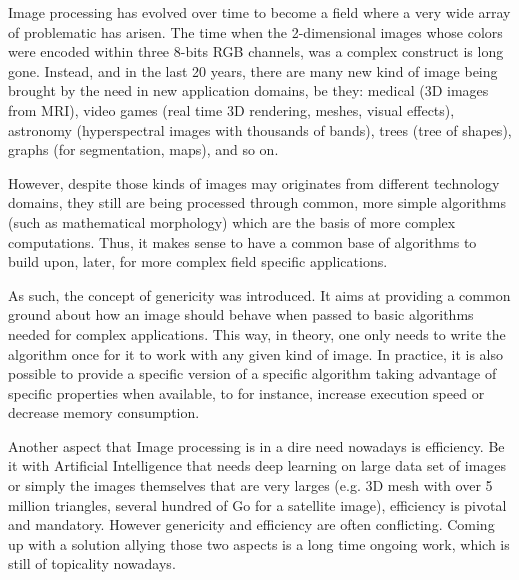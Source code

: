 Image processing has evolved over time to become a field where a very wide array of problematic has
arisen. The time when the 2-dimensional images whose colors were encoded within three 8-bits RGB channels, was a complex
construct is long gone. Instead, and in the last 20 years, there are many new kind of image being brought by the need in
new application domains, be they: medical (3D images from MRI), video games (real time 3D rendering, meshes, visual
effects), astronomy (hyperspectral images with thousands of bands), trees (tree of shapes), graphs (for segmentation,
maps), and so on.

However, despite those kinds of images may originates from different technology domains, they still are being processed
through common, more simple algorithms (such as mathematical morphology) which are the basis of more complex
computations. Thus, it makes sense to have a common base of algorithms to build upon, later, for more complex field
specific applications.

As such, the concept of genericity was introduced. It aims at providing a common ground about how an image should behave
when passed to basic algorithms needed for complex applications. This way, in theory, one only needs to write the
algorithm once for it to work with any given kind of image. In practice, it is also possible to provide a specific
version of a specific algorithm taking advantage of specific properties when available, to for instance, increase
execution speed or decrease memory consumption.

Another aspect that Image processing is in a dire need nowadays is efficiency. Be it with Artificial Intelligence that
needs deep learning on large data set of images or simply the images themselves that are very larges (e.g. 3D mesh with
over 5 million triangles, several hundred of Go for a satellite image), efficiency is pivotal and mandatory. However
genericity and efficiency are often conflicting. Coming up with a solution allying those two aspects is a long time
ongoing work, which is still of topicality nowadays.~\citep{geraud.2012.hdr}

